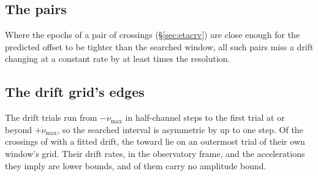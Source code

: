 \subsection{The pairs}
\label{sec:pairacct}

Where the epochs of a pair of crossings (\S\ref{sec:etacrv}) are close
enough for the predicted offset to be tighter than the searched window, all
\TjNPower{} such pairs miss a drift changing at a constant rate by at least
\TjSigMin{} times the resolution.

\subsection{The drift grid's edges}
\label{sec:edge}

The drift trials run from $-\dot\nu_{\max}$ in half-channel steps to the
first trial at or beyond $+\dot\nu_{\max}$, so the searched interval is
asymmetric by up to one step. Of the \EgNDrift{} crossings of \EgDriftPop{}
with a fitted drift, the \EgNEdge{} toward \EgEdgeStars{} lie on an
outermost trial of their own window's grid. Their drift rates, in the
observatory frame, and the accelerations they imply are lower bounds, and
\EgNEdgeOut{} of them carry no amplitude bound.
